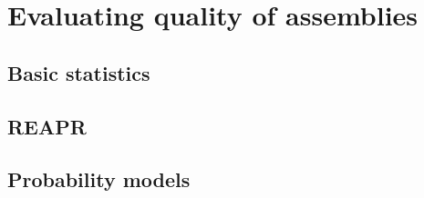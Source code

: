 \chapter{Evaluating quality of assemblies}

\section{Basic statistics}

\section{REAPR}

\section{Probability models}

